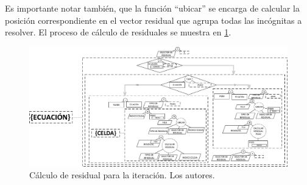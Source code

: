 Es importante notar también, que la función ``ubicar'' se encarga de calcular la posición correspondiente en el vector residual que agrupa todas las incógnitas a resolver. El proceso de cálculo de residuales se muestra en \ref{fig:Residual}. \\ %

\begin{figure}[h]
	\centering%
	\includegraphics[width=\linewidth]{Fig/Residual.pdf}%
	\caption[Cálculo de residual para la iteración.]{Cálculo de residual para la iteración. Los autores.} \label{fig:Residual}
\end{figure}

